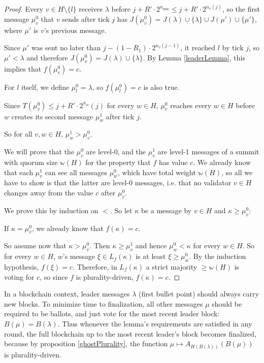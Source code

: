 \documentclass[12pt]{article}
\begin{document}
\begin{proof}
  Every $v \in H \setminus \{l\}$ receives $\lambda$ before $j + R' \cdot 2^{n_{\min}} \leq j + R' \cdot 2^{n_v(j)}$, so the first message $\mu^0_v$ that $v$ sends after tick $j$ has $J(\mu^0_v) = J(\lambda) \cup \{ \lambda \} \cup J(\mu') \cup \{ \mu' \}$, where $\mu'$ is $v$'s previous message.

  Since $\mu'$ was sent no later than $j - (1 - R_1) \cdot 2^{n_v(j - 1)}$, it reached $l$ by tick $j$, so $\mu' < \lambda$ and therefore $J(\mu^0_v) = J(\lambda) \cup \{ \lambda \}$. By Lemma \ref{leaderLemma}, this implies that $f(\mu^0_v) = c$.

  For $l$ itself, we define $\mu^0_l = \lambda$, so $f(\mu^0_l) = c$ is also true.

  Since $T(\mu^0_v) \leq j + R' \cdot 2^{n_w}(j)$ for every $w \in H$, $\mu^0_v$ reaches every $w \in H$ before $w$ creates its second message $\mu^1_w$ after tick $j$.

  So for all $v, w \in H$, $\mu^1_w > \mu^0_v$.

  We will prove that the $\mu^0_v$ are level-0, and the $\mu^1_v$ are level-1 messages of a summit with quorum size $\mathbb{w}(H)$ for the property that $f$ has value $c$. We already know that each $\mu^1_v$ can see all messages $\mu^0_w$, which have total weight $\mathbb{w}(H)$, so all we have to show is that the latter are level-0 messages, i.e. that no validator $v \in H$ changes away from the value $c$ after $\mu^0_v$.

  We prove this by induction on $<$. So let $\kappa$ be a message by $v \in H$ and $\kappa \geq \mu^0_v$:

  If $\kappa = \mu^0_v$, we already know that $f(\kappa) = c$.

  So assume now that $\kappa > \mu^0_v$. Then $\kappa \geq \mu^1_v$ and hence $\mu^0_w < \kappa$ for every $w \in H$. So for every $w \in H$, $w$'s message $\xi \in L_f(\kappa)$ is at least $\xi \geq \mu^0_w$. By the induction hypothesis, $f(\xi) = c$. Therefore, in $L_f(\kappa)$ a strict majority $\geq \mathbb{w}(H)$ is voting for $c$, so since $f$ is plurality-driven, $f(\kappa) = c$.
\end{proof}

In a blockchain context, leader messages $\lambda$ (first bullet point) should always carry new blocks. To minimize time to finalization, all other messages $\mu$ should be required to be ballots, and just vote for the most recent leader block: $B(\mu) = B(\lambda)$. Thus whenever the lemma's requirements are satisfied in any round, the full blockchain up to the most recent leader's block becomes finalized, because by proposition \ref{ghostPlurality}, the function $\mu \mapsto A_{H(B(\lambda))}(B(\mu))$ is plurality-driven.
\end{document}
